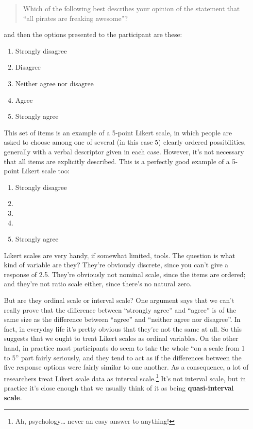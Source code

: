 \documentclass[
  a4paper,
]{book}
\providecommand{\tightlist}{%
  \setlength{\itemsep}{0pt}\setlength{\parskip}{0pt}}\usepackage{longtable,booktabs,array}
\begin{document}
\begin{quote}
Which of the following best describes your opinion of the statement that
``all pirates are freaking awesome''?
\end{quote}

and then the options presented to the participant are these:

\begin{enumerate}
\def\labelenumi{\arabic{enumi}.}
\tightlist
\item
  Strongly disagree
\item
  Disagree
\item
  Neither agree nor disagree
\item
  Agree
\item
  Strongly agree
\end{enumerate}

This set of items is an example of a 5-point Likert scale, in which
people are asked to choose among one of several (in this case 5) clearly
ordered possibilities, generally with a verbal descriptor given in each
case. However, it's not necessary that all items are explicitly
described. This is a perfectly good example of a 5-point Likert scale
too:

\begin{enumerate}
\def\labelenumi{\arabic{enumi}.}
\tightlist
\item
  Strongly disagree
\item
\item
\item
\item
  Strongly agree
\end{enumerate}

Likert scales are very handy, if somewhat limited, tools. The question
is what kind of variable are they? They're obviously discrete, since you
can't give a response of 2.5. They're obviously not nominal scale, since
the items are ordered; and they're not ratio scale either, since there's
no natural zero.

But are they ordinal scale or interval scale? One argument says that we
can't really prove that the difference between ``strongly agree'' and
``agree'' is of the same size as the difference between ``agree'' and
``neither agree nor disagree''. In fact, in everyday life it's pretty
obvious that they're not the same at all. So this suggests that we ought
to treat Likert scales as ordinal variables. On the other hand, in
practice most participants do seem to take the whole ``on a scale from 1
to 5'' part fairly seriously, and they tend to act as if the differences
between the five response options were fairly similar to one another. As
a consequence, a lot of researchers treat Likert scale data as interval
scale.\footnote{Ah, psychology\ldots{} never an easy answer to anything!}
It's not interval scale, but in practice it's close enough that we
usually think of it as being \textbf{quasi-interval scale}.
\end{document}
